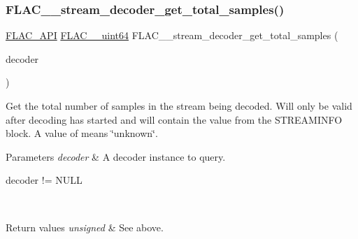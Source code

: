 \subsubsection{\texorpdfstring{F\+L\+A\+C\+\_\+\+\_\+stream\+\_\+decoder\+\_\+get\+\_\+total\+\_\+samples()}{FLAC\_\_stream\_decoder\_get\_total\_samples()}}
{\footnotesize\ttfamily \hyperlink{group__flac__export_ga56ca07df8a23310707732b1c0007d6f5}{F\+L\+A\+C\+\_\+\+A\+PI} \hyperlink{ordinals_8h_aa78c8c70a3eb8a58af7436f278acde8e}{F\+L\+A\+C\+\_\+\+\_\+uint64} F\+L\+A\+C\+\_\+\+\_\+stream\+\_\+decoder\+\_\+get\+\_\+total\+\_\+samples (\begin{DoxyParamCaption}\item[{\hyperlink{zconf_8h_a2c212835823e3c54a8ab6d95c652660e}{const} \hyperlink{struct_f_l_a_c_____stream_decoder}{F\+L\+A\+C\+\_\+\+\_\+\+Stream\+Decoder} $\ast$}]{decoder }\end{DoxyParamCaption})}

Get the total number of samples in the stream being decoded. Will only be valid after decoding has started and will contain the value from the {\ttfamily S\+T\+R\+E\+A\+M\+I\+N\+FO} block. A value of {} means \char`\"{}unknown\char`\"{}.


\begin{DoxyParams}{Parameters}
{\em decoder} & A decoder instance to query.  
\begin{DoxyCode}
decoder != NULL 
\end{DoxyCode}
 \\
\hline
\end{DoxyParams}

\begin{DoxyRetVals}{Return values}
{\em unsigned} & See above. \\
\hline
\end{DoxyRetVals}
\mbox{\label{group__flac__stream__decoder_ga38f9eb46bf112af205f86b4cbac9980c}} 

